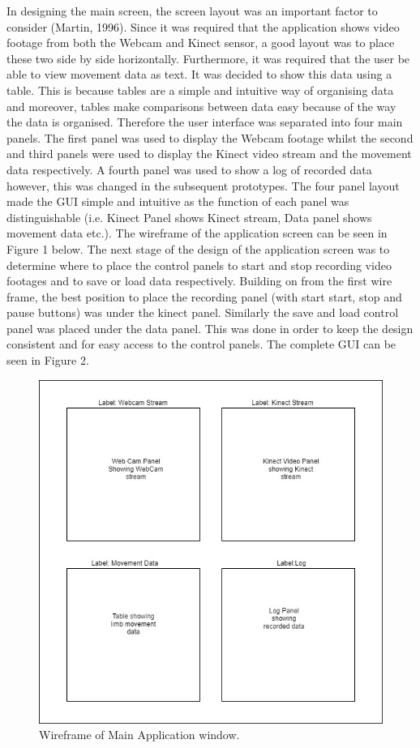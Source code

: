 \documentclass[a4paper, 12pt]{article}
\begin{document}
In designing the main screen, the screen layout was an important factor to consider (Martin, 1996). Since it was required that the application shows video footage from both the Webcam and Kinect sensor, a good layout was to place these two side by side horizontally. Furthermore, it was required that the user be able to view movement data as text. It was decided to show this data using a table. This is because tables are a simple and intuitive way of organising data and moreover, tables make comparisons between data easy because of the way the data is organised. Therefore the user interface was separated into four main panels. The first panel was used to display the Webcam footage whilst the second and third panels were used to display the Kinect video stream and the movement data respectively. A fourth panel was used to show a log of recorded data however, this was changed in the subsequent prototypes. The four panel layout made the GUI simple and intuitive as the function of each panel was distinguishable (i.e. Kinect Panel shows Kinect stream, Data panel shows movement data etc.). The wireframe of the application screen can be seen in Figure 1 below. The next stage of the design of the application screen was to determine where to place the control panels to start and stop recording video footages and to save or load data respectively. Building on from the first wire frame, the best position to place the recording panel (with start start, stop and pause buttons) was under the kinect panel. Similarly the save and load control panel was placed under the data panel. This was done in order to keep the design consistent and for easy access to the control panels. The complete GUI can be seen in Figure 2.  


\begin{figure}
  \begin{center}
  \includegraphics[scale=0.7]{appgui.jpg}
  	\caption{Wireframe of Main Application window.}
  \end{center} 
  \label{fig:appgui} 
\end{figure}
\end{document}
